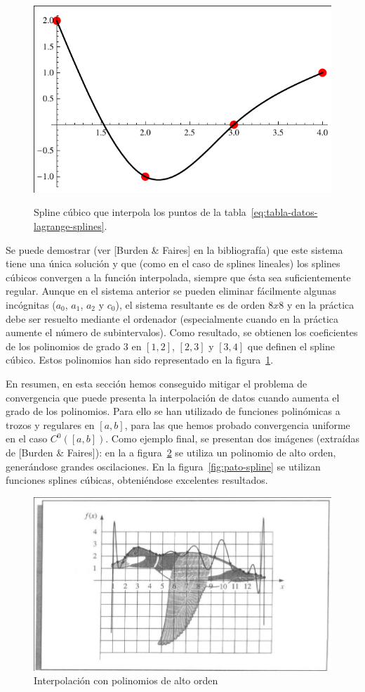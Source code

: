 \begin{figure}
  \centering
  \includegraphics[width=0.4\linewidth]{tema2/spline-cubico}
 \label{fig:spline-cubico} 
 \caption{Spline cúbico que interpola los puntos de la
   tabla~\ref{eq:tabla-datos-lagrange-splines}.}
\end{figure}
Se puede demostrar (ver [Burden \& Faires] en la bibliografía) que
este sistema tiene una única solución y que (como en el caso de
splines lineales) los splines cúbicos convergen a la función
interpolada, siempre que ésta sea suficientemente regular. 
Aunque en el sistema anterior se pueden eliminar fácilmente algunas
incógnitas ($a_0$, $a_1$, $a_2$ y $c_0$), el sistema resultante
es de orden $8x8$ y en la práctica debe ser resuelto mediante el
ordenador (especialmente cuando en la práctica aumente el número de
subintervalos). Como resultado, se obtienen los coeficientes de los
polinomios de grado $3$ en $[1,2]$, $[2,3]$ y $[3,4]$ que definen el
spline cúbico. Estos polinomios han sido representado en la
figura~\ref{fig:spline-cubico}.


En resumen, en esta sección hemos conseguido mitigar el problema de
convergencia que puede presenta la interpolación de datos cuando
aumenta el grado de los polinomios. Para ello se han utilizado de
funciones polinómicas a trozos y regulares en $[a,b]$, para las que
hemos probado convergencia uniforme en el caso $C^0([a,b])$. Como
ejemplo final, se presentan dos imágenes (extraídas de [Burden \&
Faires]): en la a figura~\ref{fig:pato-alto-orden} se utiliza un
polinomio de alto orden, generándose grandes oscilaciones. En la
figura~\ref{fig:pato-spline} se utilizan funciones splines cúbicas,
obteniéndose excelentes resultados.

\begin{figure}
  \centering
  \includegraphics[width=0.75\linewidth]{tema2/pato-interpol}
  \caption{Interpolación con polinomios de alto orden}
  \label{fig:pato-alto-orden}
\end{figure}

